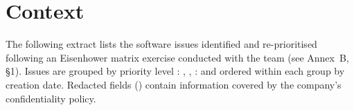 \bigskip

\section*{Context}

The following extract lists the software issues identified and re-prioritised
following an Eisenhower matrix exercise conducted with the team (see Annex~B,
\S1). Issues are grouped by priority level : \highprio, \mediumprio,
\lowprio{} : and ordered within each group by creation date. Redacted fields
(\caviarder[0.9cm]) contain information covered by the company's
confidentiality policy.

\bigskip


